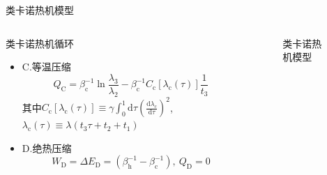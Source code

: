 \documentclass{beamer}
\newcommand{\DD}[2]{\frac{\mathrm{d} #1}{\mathrm{d} #2}}
\begin{document}
\begin{frame}{类卡诺热机模型}
    \begin{columns}
        \begin{column}{.7\textwidth}
            \begin{block}{类卡诺热机循环}
            \begin{itemize}
            \item<2-> C.等温压缩
            \begin{equation}
                Q_{\mathrm{C}} = \beta_{\mathrm{c}}^{-1} \ln{\frac{\lambda_3}{\lambda_2}} - \beta_{\mathrm{c}}^{-1} C_{\mathrm{c}} [\lambda_{\mathrm{c}}(\tau)] \frac{1}{t_3}
                \label{eq3.18}
            \end{equation}
            其中$C_{\mathrm{c}} [\lambda_{\mathrm{c}}(\tau)]\equiv \gamma \int_{0}^{1} \mathrm{d} \tau    \left(\DD{\lambda_{c}}{\tau}\right)^2$,$\lambda_{\mathrm{c}}(\tau)\equiv\lambda(t_3 \tau + t_2 +t_1)$
            \item<3-> D.绝热压缩         
            \begin{equation}
                W_{\mathrm{D}} = \Delta E_{\mathrm{D}} = (\beta_{\mathrm{h}}^{-1} - \beta_{\mathrm{c}}^{-1}),\  Q_{\mathrm{D}}=0
                \label{eq3.19}
            \end{equation}
            \end{itemize}
            \end{block}          
        \end{column}
        \begin{column}{.4\textwidth}
        \begin{figure}
            \centering
            \def\svgwidth{\columnwidth}
            
            \setcounter{figure}{0}
            \caption{类卡诺热机模型}
            \end{figure}
        \end{column}   
    \end{columns}
\end{frame}
\end{document}

